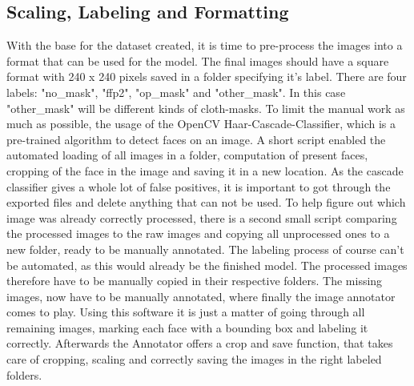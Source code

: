 \subsection{Scaling, Labeling and Formatting}

With the base for the dataset created, it is time to pre-process the images into
a format that can be used for the model. The final images should have a square
format with 240 x 240 pixels saved in a folder specifying it's label. There are
four labels: "no\_mask", "ffp2", "op\_mask" and "other\_mask". In this case
"other\_mask" will be different kinds of cloth-masks.
\newline
To limit the manual work as much as possible, the usage of the OpenCV
Haar-Cascade-Classifier, which is a pre-trained algorithm to detect faces on an
image. A short script enabled the automated loading of all images in a folder,
computation of present faces, cropping of the face in the image and saving it in
a new location. As the cascade classifier gives a whole lot of false positives,
it is important to got through the exported files and delete anything that can
not be used. To help figure out which image was already correctly processed,
there is a second small script comparing the processed images to the raw images
and copying all unprocessed ones to a new folder, ready to be manually
annotated. 
\newline
The labeling process of course can't be automated, as this would already be the
finished model. The processed images therefore have to be manually copied in
their respective folders.
\newline
The missing images, now have to be manually annotated, where finally the
image annotator comes to play. Using this software it is just a matter of going
through all remaining images, marking each face with a bounding box and labeling
it correctly. Afterwards the Annotator offers a crop and save function, that
takes care of cropping, scaling and correctly saving the images in the right
labeled folders.
